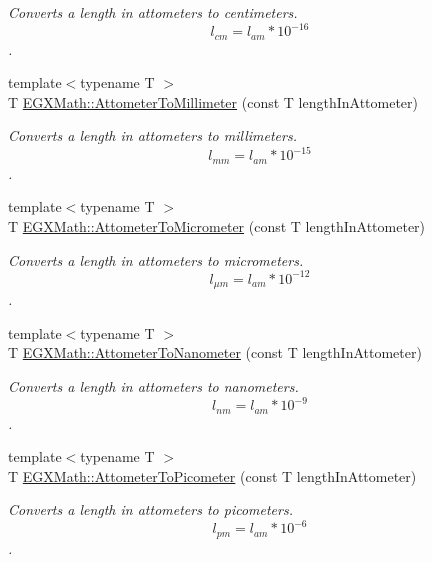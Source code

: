 \begin{DoxyCompactItemize}
\begin{DoxyCompactList}\small\item\em Converts a length in attometers to centimeters. \[ l_{cm}=l_{am} * 10^{-16} \]. \end{DoxyCompactList}\item 
{\footnotesize template$<$typename T $>$ }\\T \mbox{\hyperlink{group___e_g_x_math-_conversions-_length_conversions-_s_i-_attometer-_s_i_gaa1844671e09a5d485145eb7cc152ba19}{E\+G\+X\+Math\+::\+Attometer\+To\+Millimeter}} (const T length\+In\+Attometer)
\begin{DoxyCompactList}\small\item\em Converts a length in attometers to millimeters. \[ l_{mm}=l_{am} * 10^{-15} \]. \end{DoxyCompactList}\item 
{\footnotesize template$<$typename T $>$ }\\T \mbox{\hyperlink{group___e_g_x_math-_conversions-_length_conversions-_s_i-_attometer-_s_i_gaa98a14657ea865a6cac8fb8fc42172a2}{E\+G\+X\+Math\+::\+Attometer\+To\+Micrometer}} (const T length\+In\+Attometer)
\begin{DoxyCompactList}\small\item\em Converts a length in attometers to micrometers. \[ l_{\mu m}=l_{am} * 10^{-12} \]. \end{DoxyCompactList}\item 
{\footnotesize template$<$typename T $>$ }\\T \mbox{\hyperlink{group___e_g_x_math-_conversions-_length_conversions-_s_i-_attometer-_s_i_gacb010bf3c4fb120c4a43cf16c7d9c77f}{E\+G\+X\+Math\+::\+Attometer\+To\+Nanometer}} (const T length\+In\+Attometer)
\begin{DoxyCompactList}\small\item\em Converts a length in attometers to nanometers. \[ l_{nm}=l_{am} * 10^{-9} \]. \end{DoxyCompactList}\item 
{\footnotesize template$<$typename T $>$ }\\T \mbox{\hyperlink{group___e_g_x_math-_conversions-_length_conversions-_s_i-_attometer-_s_i_ga46ccf47b501bffeb16bc792377e55991}{E\+G\+X\+Math\+::\+Attometer\+To\+Picometer}} (const T length\+In\+Attometer)
\begin{DoxyCompactList}\small\item\em Converts a length in attometers to picometers. \[ l_{pm}=l_{am} * 10^{-6} \]. \end{DoxyCompactList}\item 

\end{DoxyCompactItemize}
